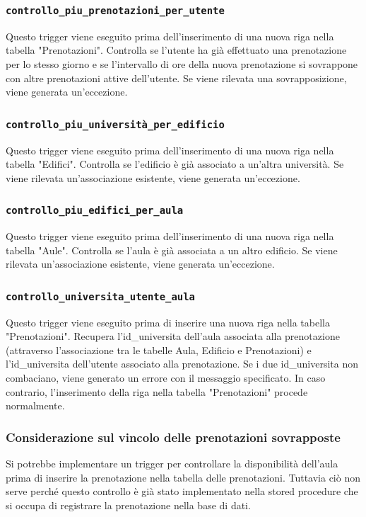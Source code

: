 \documentclass[a4paper, 10pt, oneside]{article} %
\begin{document}
\subsubsection*{\texttt{controllo\_piu\_prenotazioni\_per\_utente}}

Questo trigger viene eseguito prima dell'inserimento di una nuova riga nella tabella "Prenotazioni". Controlla se l'utente ha già effettuato una prenotazione per lo stesso giorno e se l'intervallo di ore della nuova prenotazione si sovrappone con altre prenotazioni attive dell'utente. Se viene rilevata una sovrapposizione, viene generata un'eccezione.


\subsubsection*{\texttt{controllo\_piu\_università\_per\_edificio}}
Questo trigger viene eseguito prima dell'inserimento di una nuova riga nella tabella "Edifici". Controlla se l'edificio è già associato a un'altra università. Se viene rilevata un'associazione esistente, viene generata un'eccezione.

\subsubsection*{\texttt{controllo\_piu\_edifici\_per\_aula}}

Questo trigger viene eseguito prima dell'inserimento di una nuova riga nella tabella "Aule". Controlla se l'aula è già associata a un altro edificio. Se viene rilevata un'associazione esistente, viene generata un'eccezione.

\subsubsection*{\texttt{controllo\_universita\_utente\_aula}}

Questo trigger viene eseguito prima di inserire una nuova riga nella tabella "Prenotazioni". Recupera l'id\_universita dell'aula associata alla prenotazione (attraverso l'associazione tra le tabelle Aula, Edificio e Prenotazioni) e l'id\_universita dell'utente associato alla prenotazione. Se i due id\_universita non combaciano, viene generato un errore con il messaggio specificato. In caso contrario, l'inserimento della riga nella tabella "Prenotazioni" procede normalmente.

\subsubsection*{Considerazione sul vincolo delle prenotazioni sovrapposte}
Si potrebbe implementare un trigger per controllare la disponibilità dell'aula prima di inserire la prenotazione nella tabella delle prenotazioni. Tuttavia ciò non serve perché questo controllo è già stato implementato nella stored procedure che si occupa di registrare la prenotazione nella base di dati.
\end{document}
